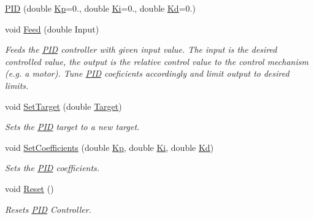 \begin{DoxyCompactItemize}
\item 
\hyperlink{class_robotics_library_1_1_controllers_1_1_p_i_d_a2b61da609180184fe7a40cba5d8d7cbf}{P\+ID} (double \hyperlink{class_robotics_library_1_1_controllers_1_1_p_i_d_a4764d2e429482ed1f8391e99e41a7e88}{Kp}=0., double \hyperlink{class_robotics_library_1_1_controllers_1_1_p_i_d_a11e36b7dec5f85a7a0b209288059aa3f}{Ki}=0., double \hyperlink{class_robotics_library_1_1_controllers_1_1_p_i_d_acd3c1beab5e18d1e6a50bc3164a8bec1}{Kd}=0.)
\item 
void \hyperlink{class_robotics_library_1_1_controllers_1_1_p_i_d_a933cc736e6142b6ff531c33243c35549}{Feed} (double Input)
\begin{DoxyCompactList}\small\item\em Feeds the \hyperlink{class_robotics_library_1_1_controllers_1_1_p_i_d}{P\+ID} controller with given input value. The input is the desired controlled value, the output is the relative control value to the control mechanism (e.\+g. a motor). Tune \hyperlink{class_robotics_library_1_1_controllers_1_1_p_i_d}{P\+ID} coeficients accordingly and limit output to desired limits. \end{DoxyCompactList}\item 
void \hyperlink{class_robotics_library_1_1_controllers_1_1_p_i_d_aa4d528cb3b0adef1dfe42879319fcbb5}{Set\+Target} (double \hyperlink{class_robotics_library_1_1_controllers_1_1_p_i_d_af5293a3d22a040b5a88ff0240fe01870}{Target})
\begin{DoxyCompactList}\small\item\em Sets the \hyperlink{class_robotics_library_1_1_controllers_1_1_p_i_d}{P\+ID} target to a new target. \end{DoxyCompactList}\item 
void \hyperlink{class_robotics_library_1_1_controllers_1_1_p_i_d_ab9aaa784943a2afcb07cf7b87cb8d5c3}{Set\+Coefficients} (double \hyperlink{class_robotics_library_1_1_controllers_1_1_p_i_d_a4764d2e429482ed1f8391e99e41a7e88}{Kp}, double \hyperlink{class_robotics_library_1_1_controllers_1_1_p_i_d_a11e36b7dec5f85a7a0b209288059aa3f}{Ki}, double \hyperlink{class_robotics_library_1_1_controllers_1_1_p_i_d_acd3c1beab5e18d1e6a50bc3164a8bec1}{Kd})
\begin{DoxyCompactList}\small\item\em Sets the \hyperlink{class_robotics_library_1_1_controllers_1_1_p_i_d}{P\+ID} coefficients. \end{DoxyCompactList}\item 
void \hyperlink{class_robotics_library_1_1_controllers_1_1_p_i_d_aeb32b13f82f1bce070b8b3447eb598ac}{Reset} ()
\begin{DoxyCompactList}\small\item\em Resets \hyperlink{class_robotics_library_1_1_controllers_1_1_p_i_d}{P\+ID} Controller. \end{DoxyCompactList}\end{DoxyCompactItemize}
